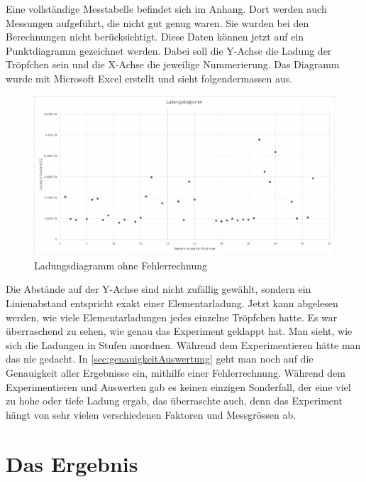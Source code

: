Eine vollständige Messtabelle befindet sich im Anhang. Dort werden auch Messungen aufgeführt, die nicht gut genug waren. Sie wurden bei den Berechnungen nicht berücksichtigt. Diese Daten können jetzt auf ein Punktdiagramm gezeichnet werden. Dabei soll die Y-Achse die Ladung der Tröpfchen sein und die X-Achse die jeweilige Nummerierung. Das Diagramm wurde mit Microsoft Excel erstellt und sieht folgendermassen aus.

\begin{figure}[h]
	\centering
	\includegraphics[width=\textwidth]{bilder/pdf/LadungsdiagrammOhne.pdf}
	\caption{Ladungsdiagramm ohne Fehlerrechnung}
	\label{fig:ladungsdiagrammOFehlerrechnung}
\end{figure}

Die Abstände auf der Y-Achse sind nicht zufällig gewählt, sondern ein Linienabstand entspricht exakt einer Elementarladung. Jetzt kann abgelesen werden, wie viele Elementarladungen jedes einzelne Tröpfchen hatte. Es war überraschend zu sehen, wie genau das Experiment geklappt hat. Man sieht, wie sich die Ladungen in Stufen anordnen. Während dem Experimentieren hätte man das nie gedacht. In \autoref{sec:genauigkeitAuswertung} geht man noch auf die Genauigkeit aller Ergebnisse ein, mithilfe einer Fehlerrechnung. Während dem Experimentieren und Auswerten gab es keinen einzigen Sonderfall, der eine viel zu hohe oder tiefe Ladung ergab, das überraschte auch, denn das Experiment hängt von sehr vielen verschiedenen Faktoren und Messgrössen ab.

\section{Das Ergebnis}\label{sec:ergebnis}